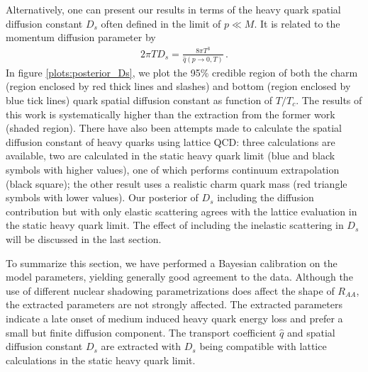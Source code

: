 \documentclass[aps, prc, reprint, amsmath, groupedaddress, nofootinbib]{revtex4-1}
\begin{document}
Alternatively, one can present our results in terms of the heavy quark spatial diffusion constant $D_s$ often defined in the limit of $p\ll M$.
It is related to the momentum diffusion parameter by
\begin{eqnarray}
2\pi T D_s = \frac{8\pi T^3}{\hat{q}(p\rightarrow 0, T)} \, .
\end{eqnarray}
In figure \ref{plots:posterior_Ds}, we plot the 95\% credible region of both the charm (region enclosed by red thick lines and slashes) and bottom (region enclosed by blue tick lines) quark spatial diffusion constant as function of $T/T_c$.
The results of this work is systematically higher than the extraction from the former work (shaded region).
There have also been attempts made to calculate the spatial diffusion constant of heavy quarks using lattice QCD: three calculations are available, two are calculated in the static heavy quark limit (blue and black symbols with higher values), one of which performs continuum extrapolation (black square); the other result uses a realistic charm quark mass (red triangle symbols with lower values).
Our posterior of $D_s$ including the diffusion contribution but with only elastic scattering agrees with the lattice evaluation in the static heavy quark limit.
The effect of including the inelastic scattering in $D_s$ will be discussed in the last section.

To summarize this section, we have performed a Bayesian calibration on the model parameters, yielding
generally good agreement to the data.
Although the use of different nuclear shadowing parametrizations does affect the shape of $R_{AA}$, the extracted parameters are not strongly affected.
The extracted parameters indicate a late onset of medium induced heavy quark energy loss and prefer a small but finite diffusion component.
The transport coefficient $\hat{q}$ and spatial diffusion constant $D_s$ are extracted with $D_s$ being compatible with lattice calculations in the static heavy quark limit. 
\end{document}
